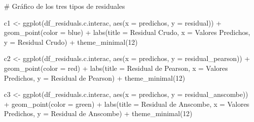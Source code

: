\documentclass[
  letterpaper,
  DIV=11,
  numbers=noendperiod]{scrartcl}
\newenvironment{Shaded}{\begin{snugshade}}{\end{snugshade}}
\newcommand{\AttributeTok}[1]{\textcolor[rgb]{0.40,0.45,0.13}{#1}}
\newcommand{\CommentTok}[1]{\textcolor[rgb]{0.37,0.37,0.37}{#1}}
\newcommand{\DecValTok}[1]{\textcolor[rgb]{0.68,0.00,0.00}{#1}}
\newcommand{\FunctionTok}[1]{\textcolor[rgb]{0.28,0.35,0.67}{#1}}
\newcommand{\NormalTok}[1]{\textcolor[rgb]{0.00,0.23,0.31}{#1}}
\newcommand{\OtherTok}[1]{\textcolor[rgb]{0.00,0.23,0.31}{#1}}
\newcommand{\SpecialCharTok}[1]{\textcolor[rgb]{0.37,0.37,0.37}{#1}}
\newcommand{\StringTok}[1]{\textcolor[rgb]{0.13,0.47,0.30}{#1}}
\begin{document}
\begin{Shaded}
\begin{Highlighting}[]
\CommentTok{\# Gráfico de los tres tipos de residuales}

\NormalTok{c1 }\OtherTok{\textless{}{-}} \FunctionTok{ggplot}\NormalTok{(df\_residuals.c.interac, }\FunctionTok{aes}\NormalTok{(}\AttributeTok{x =}\NormalTok{ predichos, }\AttributeTok{y =}\NormalTok{ residual)) }\SpecialCharTok{+}
    \FunctionTok{geom\_point}\NormalTok{(}\AttributeTok{color =} \StringTok{\textquotesingle{}blue\textquotesingle{}}\NormalTok{) }\SpecialCharTok{+}
    \FunctionTok{labs}\NormalTok{(}\AttributeTok{title =} \StringTok{\textquotesingle{}Residual Crudo\textquotesingle{}}\NormalTok{, }\AttributeTok{x =} \StringTok{\textquotesingle{}Valores Predichos\textquotesingle{}}\NormalTok{, }\AttributeTok{y =} \StringTok{\textquotesingle{}Residual Crudo\textquotesingle{}}\NormalTok{) }\SpecialCharTok{+}
    \FunctionTok{theme\_minimal}\NormalTok{(}\DecValTok{12}\NormalTok{)}

\NormalTok{c2 }\OtherTok{\textless{}{-}} \FunctionTok{ggplot}\NormalTok{(df\_residuals.c.interac, }\FunctionTok{aes}\NormalTok{(}\AttributeTok{x =}\NormalTok{ predichos, }\AttributeTok{y =}\NormalTok{ residual\_pearson)) }\SpecialCharTok{+}
    \FunctionTok{geom\_point}\NormalTok{(}\AttributeTok{color =} \StringTok{\textquotesingle{}red\textquotesingle{}}\NormalTok{) }\SpecialCharTok{+}
    \FunctionTok{labs}\NormalTok{(}\AttributeTok{title =} \StringTok{\textquotesingle{}Residual de Pearson\textquotesingle{}}\NormalTok{, }\AttributeTok{x =} \StringTok{\textquotesingle{}Valores Predichos\textquotesingle{}}\NormalTok{, }\AttributeTok{y =} \StringTok{\textquotesingle{}Residual de Pearson\textquotesingle{}}\NormalTok{) }\SpecialCharTok{+}
    \FunctionTok{theme\_minimal}\NormalTok{(}\DecValTok{12}\NormalTok{)}

\NormalTok{c3 }\OtherTok{\textless{}{-}} \FunctionTok{ggplot}\NormalTok{(df\_residuals.c.interac, }\FunctionTok{aes}\NormalTok{(}\AttributeTok{x =}\NormalTok{ predichos, }\AttributeTok{y =}\NormalTok{ residual\_anscombe)) }\SpecialCharTok{+}
    \FunctionTok{geom\_point}\NormalTok{(}\AttributeTok{color =} \StringTok{\textquotesingle{}green\textquotesingle{}}\NormalTok{) }\SpecialCharTok{+}
    \FunctionTok{labs}\NormalTok{(}\AttributeTok{title =} \StringTok{\textquotesingle{}Residual de Anscombe\textquotesingle{}}\NormalTok{, }\AttributeTok{x =} \StringTok{\textquotesingle{}Valores Predichos\textquotesingle{}}\NormalTok{, }\AttributeTok{y =} \StringTok{\textquotesingle{}Residual de Anscombe\textquotesingle{}}\NormalTok{) }\SpecialCharTok{+}
    \FunctionTok{theme\_minimal}\NormalTok{(}\DecValTok{12}\NormalTok{)}


\end{Highlighting}
\end{Shaded}
\end{document}
